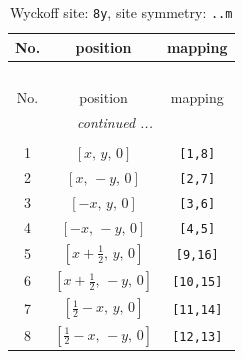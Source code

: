 \documentclass[fleqn,8pt]{jsarticle}
\begin{document}
\begin{longtable}{ccc}
\caption{Wyckoff site: {\tt 8y}, site symmetry: {\tt ..m}}
 \\
 \hline \hline
No. & position & mapping \\ \hline \endfirsthead

\multicolumn{2}{l}{\tablename\ \thetable{}} \\
 \hline \hline
No. & position & mapping \\ \hline \endhead

 \hline \hline
\multicolumn{2}{r}{\footnotesize\it continued ...} \\ \endfoot

 \hline \hline
\multicolumn{2}{r}{} \\ \endlastfoot

1 & $\left[ x,\, y,\, 0 \right]$ & {\tt [1,8]} \\ \hline
2 & $\left[ x,\, - y,\, 0 \right]$ & {\tt [2,7]} \\ \hline
3 & $\left[ - x,\, y,\, 0 \right]$ & {\tt [3,6]} \\ \hline
4 & $\left[ - x,\, - y,\, 0 \right]$ & {\tt [4,5]} \\ \hline
5 & $\left[ x + \frac{1}{2},\, y,\, 0 \right]$ & {\tt [9,16]} \\ \hline
6 & $\left[ x + \frac{1}{2},\, - y,\, 0 \right]$ & {\tt [10,15]} \\ \hline
7 & $\left[ \frac{1}{2} - x,\, y,\, 0 \right]$ & {\tt [11,14]} \\ \hline
8 & $\left[ \frac{1}{2} - x,\, - y,\, 0 \right]$ & {\tt [12,13]} \\
\end{longtable}
\renewcommand{\arraystretch}{1.2}
\end{document}
